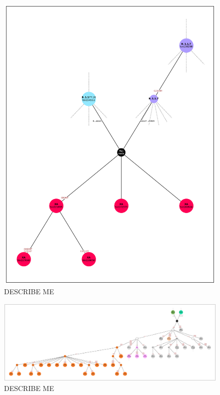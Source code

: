 \documentclass{article}
\begin{document}
\begin{figure} \centering
\includegraphics[width=\textwidth]{figures/Pango_XA_gisaid_large_graph.pdf}
\caption{\label{fig:pango_XA_gisaid_graph}  DESCRIBE ME}
\end{figure}

\begin{figure} \centering
\includegraphics[width=\textwidth]{figures/Pango_XAG_gisaid_large_graph.pdf}
\caption{\label{fig:pango_XAG_gisaid_graph}  DESCRIBE ME}
\end{figure}
\end{document}
